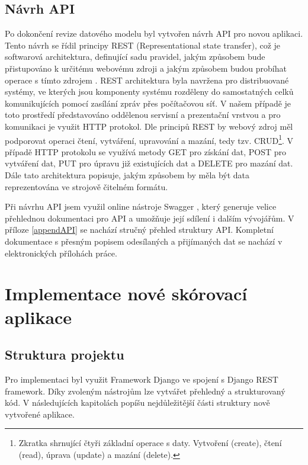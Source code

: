 \documentclass[
  digital,
  twoside,
  table, 
  nolof, 
  nolot
]{fithesis3}
\begin{document}
\newpage

\section{Návrh API}

Po dokončení revize datového modelu byl vytvořen návrh API pro novou aplikaci. Tento návrh se řídil principy REST (Representational state transfer), což je softwarová architektura, definující sadu pravidel, jakým způsobem bude přistupováno k určitému webovému zdroji a jakým způsobem budou probíhat operace s tímto zdrojem \cite{RoyThomasFielding2000ArchitecturalArchitectures}.
REST architektura byla navržena pro distribuované systémy, ve kterých jsou komponenty systému rozděleny do samostatných celků komunikujících pomocí zasílání zpráv přes počítačovou síť. V našem případě je toto prostředí představováno oddělenou servisní a prezentační vrstvou a pro komunikaci je využit HTTP protokol.  Dle principů REST by webový zdroj měl podporovat operaci čtení, vytváření, upravování a mazání, tedy tzv. CRUD\footnote{Zkratka shrnující čtyři základní operace s daty. Vytvoření (create), čtení (read), úprava (update) a mazání (delete).}. V případě HTTP protokolu se využívá metody GET pro získání dat, POST pro vytváření dat, PUT pro úpravu již existujících dat a DELETE pro mazání dat. Dále tato architektura popisuje, jakým způsobem by měla být data reprezentována ve strojově čitelném formátu. \cite{RoyThomasFielding2000ArchitecturalArchitectures}

Při návrhu API jsem využil online nástroje Swagger \cite{swagger}, který generuje velice přehlednou dokumentaci pro API a umožňuje její sdílení i dalším vývojářům. V příloze \ref{appendAPI} se nachází stručný přehled struktury API. Kompletní dokumentace s přesným popisem odesílaných a přijímaných dat se nachází v elektronických přílohách práce.

\chapter{Implementace nové skórovací aplikace}
\label{implementationNewApp}

\section{Struktura projektu}
Pro implementaci byl využit Framework Django ve spojení s Django REST framework. Díky zvoleným nástrojům lze vytvářet přehledný a strukturovaný kód. V následujících kapitolách popíšu nejdůležitější části struktury nově vytvořené aplikace.
\end{document}
